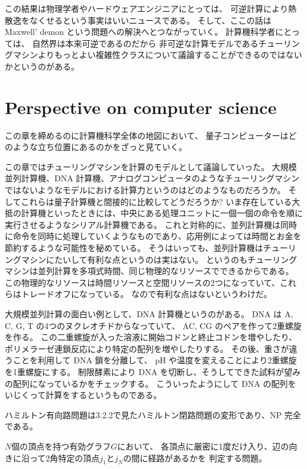 \documentclass[../../master.tex]{subfiles}
\begin{document}
この結果は物理学者やハードウェアエンジニアにとっては、
可逆計算により熱散逸をなくせるという事実はいいニュースである。
そして、ここの話は Maxwell' demon という問題への解決へとつながっていく。
計算機科学者にとっては、
自然界は本来可逆であるのだから
非可逆な計算モデルであるチューリングマシンよりもっとよい複雑性クラスについて議論することができるのではないかというのがある。

\section{Perspective on computer science}
この章を締めるのに計算機科学全体の地図において、
量子コンピューターはどのような立ち位置にあるのかをざっと見ていく。

この章ではチューリングマシンを計算のモデルとして議論していった。
大規模並列計算機、DNA 計算機、アナログコンピュータのようなチューリングマシンではないようなモデルにおける計算力というのはどのようなものだろうか。
そしてこれらは量子計算機と間接的に比較してどうだろうか?
いま存在している大抵の計算機といったときには、中央にある処理ユニットに一個一個の命令を順に実行させるようなシリアル計算機である。
これと対称的に、並列計算機は同時に命令を同時に処理していくようなものであり、応用例によっては時間とお金を節約するような可能性を秘めている。
そうはいっても、並列計算機はチューリングマシンにたいして有利な点というのは実はない。
というのもチューリングマシンは並列計算を多項式時間、同じ物理的なリソースでできるからである。
この物理的なリソースは時間リソースと空間リソースの2つになっていて、これらはトレードオフになっている。
なので有利な点はないというわけだ。

大規模並列計算の面白い例として、DNA 計算機というのがある。
DNA は A, C, G, T の4つのヌクレオチドからなっていて、
AC, CG のペアを作って2重螺旋を作る。
この二重螺旋が入った溶液に開始コドンと終止コドンを増やしたり、
ポリメラーゼ連鎖反応により特定の配列を増やしたりする。
その後、重さが違うことを利用して DNA 鎖を分離して、
pH や温度を変えることにより2重螺旋を1重螺旋にする。
制限酵素により DNA を切断し、そうしてできた試料が望みの配列になっているかをチェックする。
こういったようにして DNA の配列をいじくって計算をするというものである。

ハミルトン有向路問題は3.2.2で見たハミルトン閉路問題の変形であり、NP 完全である。
\begin{tcolorbox}[title = ハミルトン有向路問題]
    \(N\)個の頂点を持つ有効グラフ\(G\)において、
    各頂点に厳密に1度だけ入り、辺の向きに沿って2角特定の頂点\(j_1\)と\(j_N\)の間に経路があるかを
    判定する問題。
\end{tcolorbox}
\end{document}
